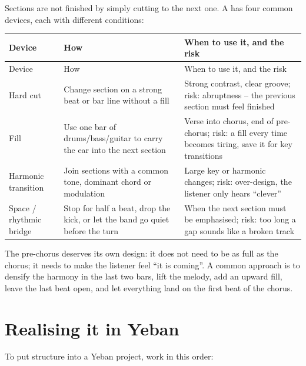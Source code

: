 Sections are not finished by simply cutting to the next one. A  has four common devices, each with different conditions:

\begin{longtable}{p{}p{}p{}}
\toprule
Device & How & When to use it, and the risk \\
\midrule
\endfirsthead
\toprule
Device & How & When to use it, and the risk \\
\midrule
\endhead
Hard cut & Change section on a strong beat or bar line without a fill & Strong contrast, clear groove; risk: abruptness -- the previous section must feel finished \\
Fill & Use one bar of drums/bass/guitar to carry the ear into the next section & Verse into chorus, end of pre-chorus; risk: a fill every time becomes tiring, save it for key transitions \\
Harmonic transition & Join sections with a common tone, dominant chord or modulation & Large key or harmonic changes; risk: over-design, the listener only hears ``clever'' \\
Space / rhythmic bridge & Stop for half a beat, drop the kick, or let the band go quiet before the turn & When the next section must be emphasised; risk: too long a gap sounds like a broken track \\
\bottomrule
\end{longtable}

The pre-chorus deserves its own design: it does not need to be as full as the chorus; it needs to make the listener feel ``it is coming''. A common approach is to densify the harmony in the last two bars, lift the melody, add an upward fill, leave the last beat open, and let everything land on the first beat of the chorus.

\section{Realising it in Yeban}
\label{sec:structure-yeban}

To put structure into a Yeban project, work in this order:

